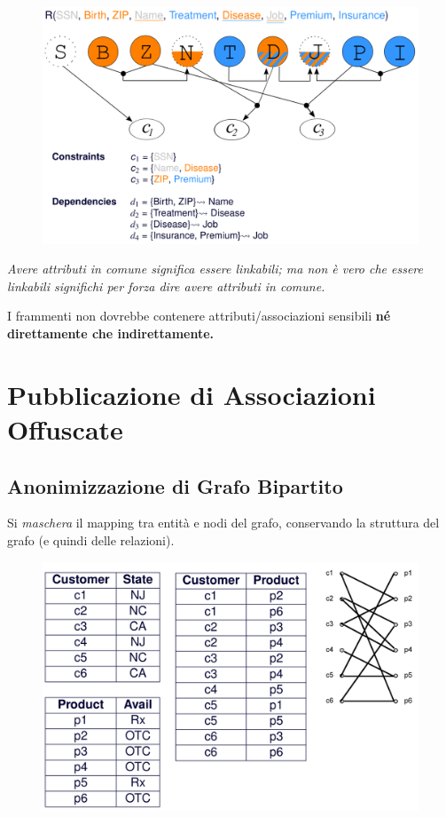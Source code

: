 \documentclass{report}
\begin{document}
\begin{figure}[ht]
    \centering
    \includegraphics[width=1\linewidth]{images/fragmentation/inference2.png}
\end{figure}

\textit{Avere attributi in comune significa essere linkabili; ma non è vero 
che essere linkabili significhi per forza dire avere attributi in comune.}

\noindent I frammenti non dovrebbe contenere attributi/associazioni sensibili 
\textbf{né direttamente che indirettamente.}

\chapter{Pubblicazione di Associazioni Offuscate}

\section{Anonimizzazione di Grafo Bipartito}
Si \textit{maschera} il mapping tra entità e nodi del grafo, 
conservando la struttura del grafo (e quindi delle relazioni).

\begin{figure}[ht]
    \centering
    \includegraphics[width=0.8\linewidth]{images/publ-obf-ass/grafo-bipartito.png}
\end{figure}
\end{document}
